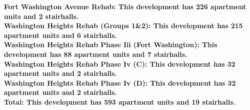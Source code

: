 \bf{Fort Washington Avenue Rehab}: This development has 226 apartment units and 2 stairhalls.\\\bf{Washington Heights Rehab (Groups 1&2)}: This development has 215 apartment units and 6 stairhalls.\\\bf{Washington Heights Rehab Phase Iii (Fort Washington)}: This development has 88 apartment units and 7 stairhalls.\\\bf{Washington Heights Rehab Phase Iv (C)}: This development has 32 apartment units and 2 stairhalls.\\\bf{Washington Heights Rehab Phase Iv (D)}: This development has 32 apartment units and 2 stairhalls.\\\bf{Total}: This development has 593 apartment units and 19 stairhalls.\\